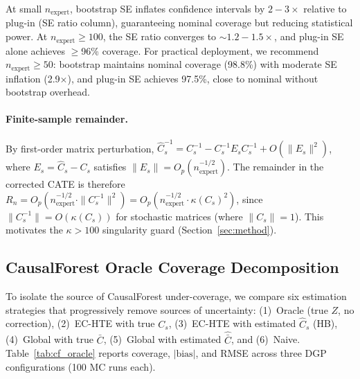 At small $n_{\text{expert}}$, bootstrap SE inflates confidence intervals by $2{-}3\times$ relative to plug-in (SE ratio column), guaranteeing nominal coverage but reducing statistical power.
At $n_{\text{expert}} \geq 100$, the SE ratio converges to ${\sim}1.2{-}1.5\times$, and plug-in SE alone achieves $\geq$96\% coverage.
For practical deployment, we recommend $n_{\text{expert}} \geq 50$: bootstrap maintains nominal coverage (98.8\%) with moderate SE inflation (2.9$\times$), and plug-in SE achieves 97.5\%, close to nominal without bootstrap overhead.

\paragraph{Finite-sample remainder.}
By first-order matrix perturbation, $\hat{C}_s^{-1} = C_s^{-1} - C_s^{-1} E_s C_s^{-1} + O(\|E_s\|^2)$, where $E_s = \hat{C}_s - C_s$ satisfies $\|E_s\| = O_p(n_{\text{expert}}^{-1/2})$.
The remainder in the corrected CATE is therefore $R_n = O_p(n_{\text{expert}}^{-1/2} \cdot \|C_s^{-1}\|^2) = O_p(n_{\text{expert}}^{-1/2} \cdot \kappa(C_s)^2)$, since $\|C_s^{-1}\| = O(\kappa(C_s))$ for stochastic matrices (where $\|C_s\| = 1$).
This motivates the $\kappa > 100$ singularity guard (Section~\ref{sec:method}).

\subsection{CausalForest Oracle Coverage Decomposition}
\label{app:cf_oracle}

To isolate the source of CausalForest under-coverage, we compare six estimation strategies that progressively remove sources of uncertainty: (1)~Oracle (true $Z$, no correction), (2)~EC-HTE with true $C_s$, (3)~EC-HTE with estimated $\hat{C}_s$ (HB), (4)~Global with true $\bar{C}$, (5)~Global with estimated $\hat{\bar{C}}$, and (6)~Naive.
Table~\ref{tab:cf_oracle} reports coverage, $|\text{bias}|$, and RMSE across three DGP configurations (100 MC runs each).

